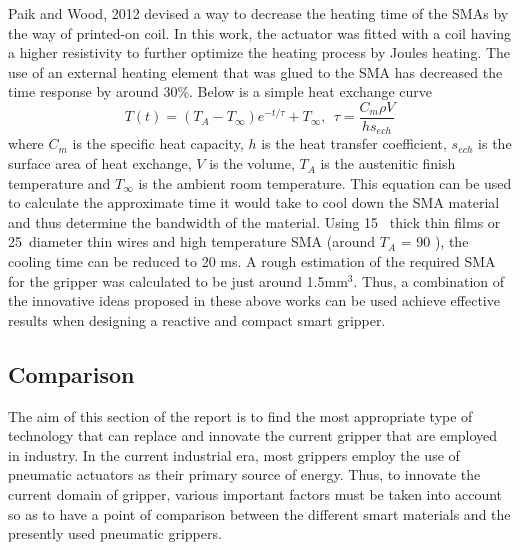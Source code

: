 Paik and Wood\cite{paik_bidirectional_2012, paik_novel_2010}, 2012 devised a way to decrease the heating time of the SMAs by the way of printed-on coil. In this work, the actuator was fitted with a coil having a higher resistivity to further optimize the heating process by Joules heating. The use of an external heating element that was glued to the SMA has decreased the time response by around 30\%. Below is a simple heat exchange curve
\begin{equation}
	\label{eq:Tech}
	T(t) = (T_A - T_{\infty})e^{-t/\tau} + T_{\infty},~~\tau = \frac{C_m\rho V}{h s_{ech}}
\end{equation}
where $C_m$ is the specific heat capacity, $h$ is the heat transfer coefficient, $s_{ech}$ is the surface area of heat exchange, $V$ is the volume, $T_A$ is the austenitic finish temperature and $T_{\infty}$ is the ambient room temperature. This equation can be used to calculate the approximate time it would take to cool down the SMA material and thus determine the bandwidth of the material. Using 15 \micrometer~thick thin films or 25~\micrometer diameter thin wires and high temperature SMA (around $T_A$ = 90 \degreeC), the cooling time can be reduced to 20 ms.
A rough estimation of the required SMA for the gripper was calculated to be just around 1.5mm$^3$. Thus, a combination of the innovative ideas proposed in these above works can be used achieve effective results when designing a reactive and compact smart gripper.

\subsection{Comparison}
The aim of this section of the report is to find the most appropriate type of technology that can replace and innovate the current gripper that are employed in industry. In the current industrial era, most grippers employ the use of pneumatic actuators as their primary source of energy. Thus, to innovate the current domain of gripper, various important factors must be taken into account so as to have a point of comparison between the different smart materials and the presently used pneumatic grippers.

